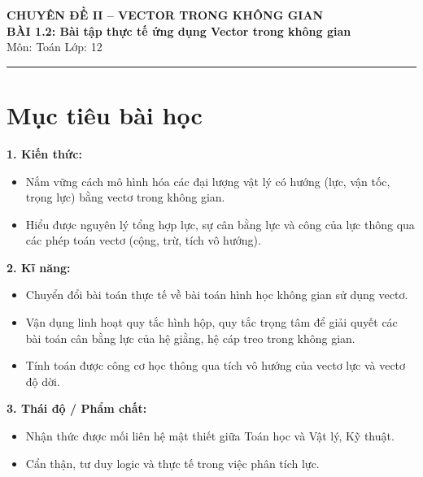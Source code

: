 \documentclass[12pt]{article}
\begin{document}
	
	\begin{center}
		{\Large\bfseries CHUYÊN ĐỀ II -- VECTOR TRONG KHÔNG GIAN}\\[4pt]
		{\Large \textbf{BÀI 1.2: Bài tập thực tế ứng dụng Vector trong không gian}}\\[4pt]
		{\large Môn: Toán \quad Lớp: 12}
	\end{center}
	\vspace{4mm}
	\hrule
	\vspace{4mm}
	
	\section*{Mục tiêu bài học}
	
	\textbf{1. Kiến thức:}
	\begin{itemize}
		\item Nắm vững cách mô hình hóa các đại lượng vật lý có hướng (lực, vận tốc, trọng lực) bằng vectơ trong không gian.
		\item Hiểu được nguyên lý tổng hợp lực, sự cân bằng lực và công của lực thông qua các phép toán vectơ (cộng, trừ, tích vô hướng).
	\end{itemize}
	
	\noindent\textbf{2. Kĩ năng:}
	\begin{itemize}
		\item Chuyển đổi bài toán thực tế về bài toán hình học không gian sử dụng vectơ.
		\item Vận dụng linh hoạt quy tắc hình hộp, quy tắc trọng tâm để giải quyết các bài toán cân bằng lực của hệ giằng, hệ cáp treo trong không gian.
		\item Tính toán được công cơ học thông qua tích vô hướng của vectơ lực và vectơ độ dời.
	\end{itemize}
	
	\noindent\textbf{3. Thái độ / Phẩm chất:}
	\begin{itemize}
		\item Nhận thức được mối liên hệ mật thiết giữa Toán học và Vật lý, Kỹ thuật.
		\item Cẩn thận, tư duy logic và thực tế trong việc phân tích lực.
	\end{itemize}
	
	\newpage
	
	\setcounter{tocdepth}{2}
	\tableofcontents
	\newpage
	
\end{document}
